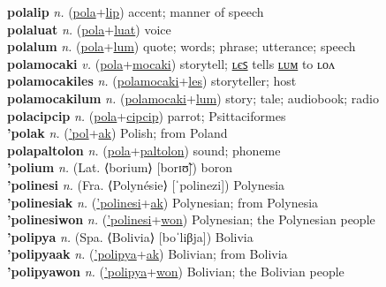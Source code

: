 \textbf{polalip} \textit{n.} (\hyperref[pola]{pola}+\hyperref[lip]{lip})
accent; manner of speech \label{polalip} \\
\textbf{polaluat} \textit{n.} (\hyperref[pola]{pola}+\hyperref[luat]{luat})
voice \label{polaluat} \\
\textbf{polalum} \textit{n.} (\hyperref[pola]{pola}+\hyperref[lum]{lum})
quote; words; phrase; utterance; speech \label{polalum} \\
\textbf{polamocaki} \textit{v.} (\hyperref[pola]{pola}+\hyperref[mocaki]{mocaki})
storytell; \hyperref[polamocakiles]{ʟєꜱ} tells \hyperref[polamocakilum]{ʟᴜᴍ} to ʟᴏᴧ \label{polamocaki} \\
\textbf{polamocakiles} \textit{n.} (\hyperref[polamocaki]{polamocaki}+\hyperref[les]{les})
storyteller; host \label{polamocakiles} \\
\textbf{polamocakilum} \textit{n.} (\hyperref[polamocaki]{polamocaki}+\hyperref[lum]{lum})
story; tale; audiobook; radio \label{polamocakilum} \\
\textbf{polacipcip} \textit{n.} (\hyperref[pola]{pola}+\hyperref[cipcip]{cipcip})
parrot; Psittaciformes \label{polacipcip} \\
\textbf{'polak} \textit{n.} (\hyperref['pol]{'pol}+\hyperref[ak]{ak})
Polish; from Poland \label{'polak} \\
\textbf{polapaltolon} \textit{n.} (\hyperref[pola]{pola}+\hyperref[paltolon]{paltolon})
sound; phoneme \label{polapaltolon} \\
\textbf{'polium} \textit{n.} (Lat. ⟨borium⟩ [borɪʊ̃])
boron \label{'polium} \\
\textbf{'polinesi} \textit{n.} (Fra. ⟨Polynésie⟩ [ˈpolinezi])
Polynesia \label{'polinesi} \\
\textbf{'polinesiak} \textit{n.} (\hyperref['polinesi]{'polinesi}+\hyperref[ak]{ak})
Polynesian; from Polynesia \label{'polinesiak} \\
\textbf{'polinesiwon} \textit{n.} (\hyperref['polinesi]{'polinesi}+\hyperref[won]{won})
Polynesian; the Polynesian people \label{'polinesiwon} \\
\textbf{'polipya} \textit{n.} (Spa. ⟨Bolivia⟩ [boˈliβja])
Bolivia \label{'polipya} \\
\textbf{'polipyaak} \textit{n.} (\hyperref['polipya]{'polipya}+\hyperref[ak]{ak})
Bolivian; from Bolivia \label{'polipyaak} \\
\textbf{'polipyawon} \textit{n.} (\hyperref['polipya]{'polipya}+\hyperref[won]{won})
Bolivian; the Bolivian people \label{'polipyawon} \\
